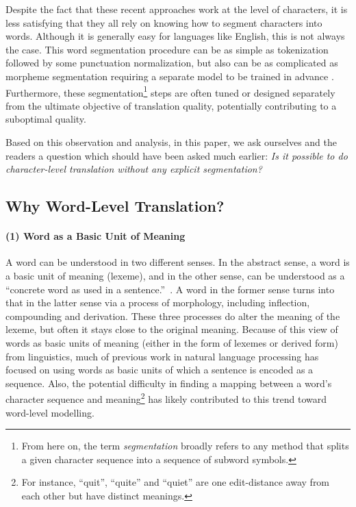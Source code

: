 \documentclass[11pt]{article}
\begin{document}
Despite the fact that these recent approaches work at the level of
characters, it is less satisfying that they all rely on knowing how to segment
characters into words. Although it is generally easy for languages like English,
this is not always the case. This word segmentation procedure can be as
simple as tokenization followed by some punctuation normalization, but also can
be as complicated as morpheme segmentation requiring a separate model to be
trained in advance \cite{creutz2005unsupervised,huang2007chinese}. Furthermore,
these segmentation\footnote{
    From here on, the term {\em segmentation} broadly refers to any
    method that splits a given character sequence into a sequence of subword
    symbols.
}
steps are often tuned or designed separately from the ultimate objective of
translation quality, potentially contributing to a suboptimal quality.

Based on this observation and analysis, in this paper, we ask ourselves and the
readers a question which should have been asked much earlier: {\em Is it
possible to do character-level translation without any explicit segmentation?}

\subsection{Why Word-Level Translation?}

\paragraph{(1) Word as a Basic Unit of Meaning}
A word can be understood in two different senses. In the abstract sense, a word
is a basic unit of meaning (lexeme), and in the other sense, can be understood
as a ``concrete word as used in a sentence.''~\cite{booij2012grammar}. A word in
the former sense turns into that in the latter sense via a process of
morphology, including inflection, compounding and derivation. These three
processes do alter the meaning of the lexeme, but often it stays close to the
original meaning.
Because of this view of words as basic units of meaning (either in the form of
lexemes or derived form) from linguistics, much of previous work in natural
language processing has focused on using words as basic units of which a
sentence is encoded as a sequence. Also, the potential difficulty in finding a
mapping between a word's character sequence and meaning\footnote{
    For instance, ``quit'', ``quite'' and ``quiet'' are one edit-distance away
    from each other but have distinct meanings.
}
has likely contributed to this trend toward word-level modelling.
\end{document}
